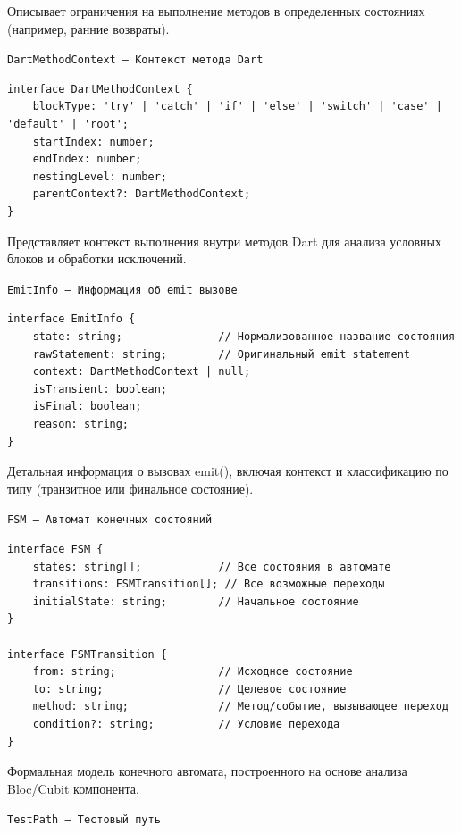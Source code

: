 \documentclass[14pt, russian]{scrartcl}
\begin{document}
Описывает ограничения на выполнение методов в определенных состояниях (например, ранние возвраты).

\texttt{DartMethodContext — Контекст метода Dart}

\begin{verbatim}
interface DartMethodContext {
    blockType: 'try' | 'catch' | 'if' | 'else' | 'switch' | 'case' | 'default' | 'root';
    startIndex: number;
    endIndex: number;
    nestingLevel: number;
    parentContext?: DartMethodContext;
}
\end{verbatim}

Представляет контекст выполнения внутри методов Dart для анализа условных блоков и обработки исключений.

\texttt{EmitInfo — Информация об emit вызове}

\begin{verbatim}
interface EmitInfo {
    state: string;               // Нормализованное название состояния
    rawStatement: string;        // Оригинальный emit statement  
    context: DartMethodContext | null;
    isTransient: boolean;
    isFinal: boolean;
    reason: string;
}
\end{verbatim}

Детальная информация о вызовах emit(), включая контекст и классификацию по типу (транзитное или финальное состояние).

\texttt{FSM — Автомат конечных состояний}
\vspace{1ex}
\begin{verbatim}
interface FSM {
    states: string[];            // Все состояния в автомате
    transitions: FSMTransition[]; // Все возможные переходы
    initialState: string;        // Начальное состояние
}

interface FSMTransition {
    from: string;                // Исходное состояние
    to: string;                  // Целевое состояние
    method: string;              // Метод/событие, вызывающее переход
    condition?: string;          // Условие перехода
}
\end{verbatim}

Формальная модель конечного автомата, построенного на основе анализа Bloc/Cubit компонента.

\texttt{TestPath — Тестовый путь}
\end{document}
